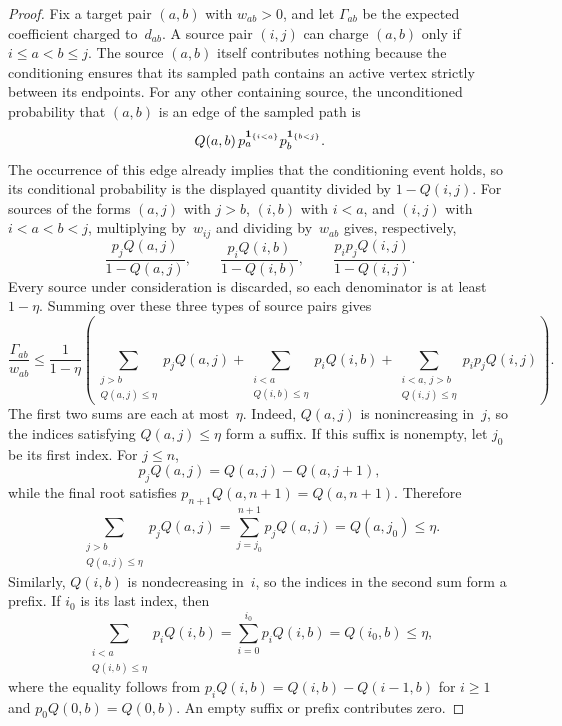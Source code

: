 \documentclass[12pt,a4paper,oneside]{report}
\begin{document}
\begin{proof}
Fix a target pair $(a,b)$ with $w_{ab}>0$, and let $\Gamma_{ab}$ be the
expected coefficient charged to~$d_{ab}$.  A source pair $(i,j)$ can charge
$(a,b)$ only if $i\le a<b\le j$.  The source $(a,b)$ itself contributes
nothing because the conditioning ensures that its sampled path contains an
active vertex strictly between its endpoints.  For any other containing
source, the unconditioned probability that $(a,b)$ is an edge of the sampled
path is
\[
    Q(a,b)\,
    p_a^{\mathbf{1}_{\{i<a\}}}
    p_b^{\mathbf{1}_{\{b<j\}}}.
\]
The occurrence of this edge already implies that the conditioning event holds,
so its conditional probability is the displayed quantity divided by
$1-Q(i,j)$.  For sources of the forms $(a,j)$ with $j>b$, $(i,b)$ with
$i<a$, and $(i,j)$ with $i<a<b<j$, multiplying by~$w_{ij}$ and dividing
by~$w_{ab}$ gives, respectively,
\[
    \frac{p_jQ(a,j)}{1-Q(a,j)},
    \qquad
    \frac{p_iQ(i,b)}{1-Q(i,b)},
    \qquad
    \frac{p_ip_jQ(i,j)}{1-Q(i,j)}.
\]
Every source under consideration is discarded, so each denominator is at
least $1-\eta$.  Summing over these three types of source pairs gives
\begin{equation}\label{eq:appendix-truncation-target-congestion}
\frac{\Gamma_{ab}}{w_{ab}}
\le\frac{1}{1-\eta}
\left(
    \sum_{\substack{j>b\\Q(a,j)\le\eta}}p_jQ(a,j)
    +\sum_{\substack{i<a\\Q(i,b)\le\eta}}p_iQ(i,b)
    +\sum_{\substack{i<a,\,j>b\\Q(i,j)\le\eta}}p_ip_jQ(i,j)
\right).
\end{equation}
The first two sums are each at most~$\eta$.  Indeed, $Q(a,j)$ is
nonincreasing in~$j$, so the indices satisfying $Q(a,j)\le\eta$ form a
suffix.  If this suffix is nonempty, let $j_0$ be its first index.  For
$j\le n$,
\[
    p_jQ(a,j)=Q(a,j)-Q(a,j+1),
\]
while the final root satisfies
$p_{n+1}Q(a,n+1)=Q(a,n+1)$.  Therefore
\[
    \sum_{\substack{j>b\\Q(a,j)\le\eta}}p_jQ(a,j)
    =\sum_{j=j_0}^{n+1}p_jQ(a,j)
    =Q(a,j_0)
    \le\eta.
\]
Similarly, $Q(i,b)$ is nondecreasing in~$i$, so the indices in the second
sum form a prefix.  If $i_0$ is its last index, then
\[
    \sum_{\substack{i<a\\Q(i,b)\le\eta}}p_iQ(i,b)
    =\sum_{i=0}^{i_0}p_iQ(i,b)
    =Q(i_0,b)
    \le\eta,
\]
where the equality follows from
$p_iQ(i,b)=Q(i,b)-Q(i-1,b)$ for $i\ge1$ and
$p_0Q(0,b)=Q(0,b)$.  An empty suffix or prefix contributes zero.


\end{proof}
\end{document}

